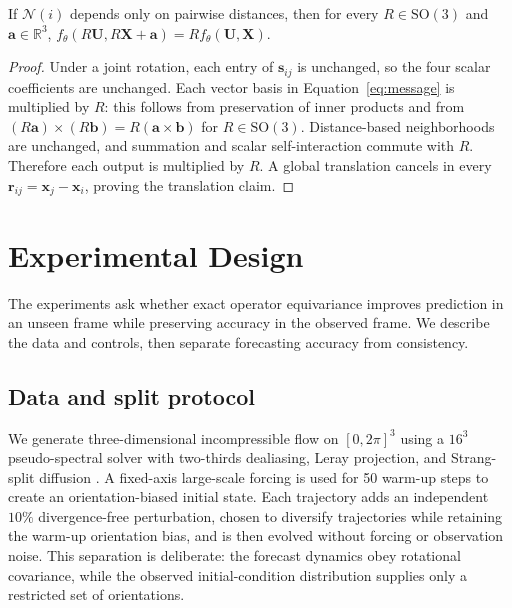 \documentclass[mlmain]{jmlr}
\newcommand{\R}{\mathbb{R}}
\newcommand{\SO}{\mathrm{SO}(3)}
\begin{document}
\begin{proposition}
If $\mathcal{N}(i)$ depends only on pairwise distances, then for every
$R\in\SO$ and $\boldsymbol a\in\R^3$,
$f_\theta(R\boldsymbol U,R\boldsymbol X+\boldsymbol a)
=R f_\theta(\boldsymbol U,\boldsymbol X)$.
\end{proposition}

\begin{proof}
Under a joint rotation, each entry of $\boldsymbol{s}_{ij}$ is unchanged, so
the four scalar coefficients are unchanged. Each vector basis in
Equation~\ref{eq:message} is multiplied by $R$: this follows from preservation
of inner products and from
$(R\boldsymbol{a})\times(R\boldsymbol{b})=R(\boldsymbol{a}\times\boldsymbol{b})$
for $R\in\SO$. Distance-based neighborhoods are unchanged, and summation and
scalar self-interaction commute with $R$. Therefore each output is multiplied
by $R$. A global translation cancels in every
$\boldsymbol r_{ij}=\boldsymbol x_j-\boldsymbol x_i$, proving the translation
claim.
\end{proof}

\section{Experimental Design}
\label{sec:experiments}

The experiments ask whether exact operator equivariance improves prediction in
an unseen frame while preserving accuracy in the observed frame. We describe
the data and controls, then separate forecasting accuracy from consistency.

\subsection{Data and split protocol}

We generate three-dimensional incompressible flow on $[0,2\pi]^3$ using a
$16^3$ pseudo-spectral solver with two-thirds dealiasing, Leray projection, and
Strang-split diffusion \citep{canuto1988spectral,strang1968construction}. A
fixed-axis large-scale forcing is used for 50 warm-up
steps to create an orientation-biased initial state. Each trajectory adds an
independent $10\%$ divergence-free perturbation, chosen to diversify
trajectories while retaining the warm-up orientation bias, and is then evolved
without forcing or observation noise. This separation is deliberate: the forecast
dynamics obey rotational covariance, while the observed initial-condition
distribution supplies only a restricted set of orientations.
\end{document}
